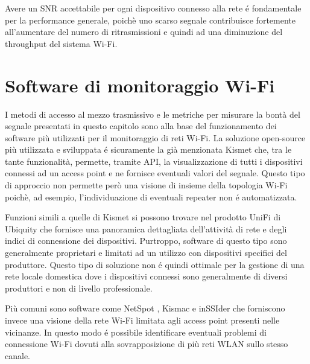 Avere un SNR accettabile per ogni dispositivo connesso alla rete \'e fondamentale per la performance generale, poich\`e uno scarso segnale contribuisce fortemente all'aumentare del numero di ritrasmissioni e quindi ad una diminuzione del throughput del sistema Wi-Fi.

\section{Software di monitoraggio Wi-Fi}

I metodi di accesso al mezzo trasmissivo e le metriche per misurare la bont\`a del segnale presentati in questo capitolo sono alla base del funzionamento dei software pi\`u utilizzati per il monitoraggio di reti Wi-Fi.
La soluzione open-source pi\`u utilizzata e sviluppata \'e sicuramente la gi\`a menzionata Kismet che, tra le tante funzionalit\`a, permette, tramite API, la visualizzazione di tutti i dispositivi connessi ad un access point e ne fornisce eventuali valori del segnale.
Questo tipo di approccio non permette per\`o una visione di insieme della topologia Wi-Fi poich\`e, ad esempio, l'individuazione di eventuali repeater non \'e automatizzata.

Funzioni simili a quelle di Kismet si possono trovare nel prodotto UniFi \cite{unifi} di Ubiquity che fornisce una panoramica dettagliata dell'attivit\`a di rete e degli indici di connessione dei dispositivi.
Purtroppo, software di questo tipo sono generalmente proprietari e limitati ad un utilizzo con dispositivi specifici del produttore.
Questo tipo di soluzione non \'e quindi ottimale per la gestione di una rete locale domestica dove i dispositivi connessi sono generalmente di diversi produttori e non di livello professionale.

Pi\`u comuni sono software come NetSpot \cite{netspot}, Kismac e inSSIder \cite{inssider} che forniscono invece una visione della rete Wi-Fi limitata agli access point presenti nelle vicinanze.
In questo modo \'e possibile identificare eventuali problemi di connessione Wi-Fi dovuti alla sovrapposizione di pi\`u reti WLAN sullo stesso canale.
